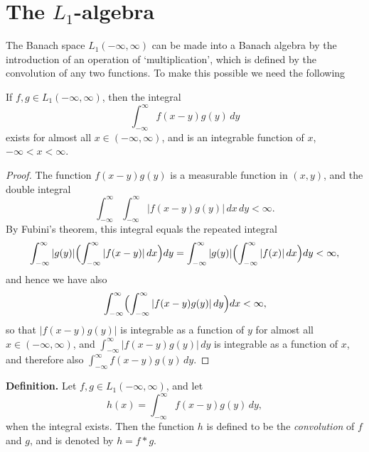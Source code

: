 \section{The \texorpdfstring{$L_1$}{L1}-algebra}
\label{sec:I-2}

The Banach space $L_1(-\infty,\infty)$ can be made into a Banach algebra by the introduction of an operation of `multiplication', which is defined by the convolution of any two functions. To make this possible we need the following

\begin{lemma}\label{lem:I-2.1}
If $f,g\in L_1(-\infty,\infty)$, then the integral
\begin{equation}\label{eq:I-2.1}
\int_{-\infty}^{\infty}f(x-y)g(y)\,dy
\end{equation}
exists for almost all $x\in(-\infty,\infty)$, and is an integrable function of $x$, $-\infty<x<\infty$.
\end{lemma}

\begin{proof}
The function $f(x-y)g(y)$ is a measurable function in $(x,y)$, and the double integral
\begin{equation*}
\int_{-\infty}^{\infty}\int_{-\infty}^{\infty}|f(x-y)g(y)|\,dx\,dy<\infty.
\end{equation*}
By Fubini's theorem, this integral equals the repeated integral
\begin{equation*}
\int_{-\infty}^{\infty}|g(y)|\Bigl(\int_{-\infty}^{\infty}|f(x-y)|\,dx\Bigr)dy
=\int_{-\infty}^{\infty}|g(y)|\Bigl(\int_{-\infty}^{\infty}|f(x)|\,dx\Bigr)dy<\infty,
\end{equation*}
and hence we have also
\begin{equation*}
\int_{-\infty}^{\infty}\Bigl(\int_{-\infty}^{\infty}|f(x-y)g(y)|\,dy\Bigr)dx<\infty,
\end{equation*}
so that $|f(x-y)g(y)|$ is integrable as a function of $y$ for almost all $x\in(-\infty,\infty)$, and $\int_{-\infty}^{\infty}|f(x-y)g(y)|\,dy$ is integrable as a function of $x$, and therefore also $\int_{-\infty}^{\infty}f(x-y)g(y)\,dy$.
\end{proof}

\noindent\textbf{Definition.}
Let $f,g\in L_1(-\infty,\infty)$, and let
\begin{equation*}
h(x)=\int_{-\infty}^{\infty}f(x-y)g(y)\,dy,
\end{equation*}
when the integral exists. Then the function $h$ is defined to be the \emph{convolution} of $f$ and $g$, and is denoted by $h=f*g$.

